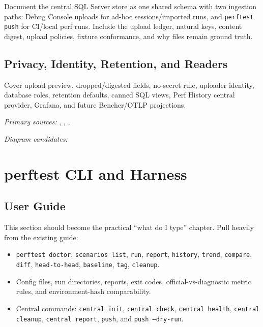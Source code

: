 \documentclass[11pt]{article}
\newcommand{\code}[1]{\texttt{#1}}
\begin{document}
Document the central SQL Server store as one shared schema with two ingestion paths: Debug Console uploads for ad-hoc sessions/imported runs, and \code{perftest push} for CI/local perf runs.  Include the upload ledger, natural keys, content digest, upload policies, fixture conformance, and why files remain ground truth.

\subsection{Privacy, Identity, Retention, and Readers}

Cover upload preview, dropped/digested fields, no-secret rule, uploader identity, database roles, retention defaults, canned SQL views, Perf History central provider, Grafana, and future Bencher/OTLP projections.

\noindent\textit{Primary sources:} , , , 

\noindent\textit{Diagram candidates:} 

\section{perftest CLI and Harness}

\subsection{User Guide}

This section should become the practical ``what do I type'' chapter.  Pull heavily from the existing guide:

\begin{itemize}
	\item \code{perftest doctor}, \code{scenarios list}, \code{run}, \code{report}, \code{history}, \code{trend}, \code{compare}, \code{diff}, \code{head-to-head}, \code{baseline}, \code{tag}, \code{cleanup}.
	\item Config files, run directories, reports, exit codes, official-vs-diagnostic metric rules, and environment-hash comparability.
	\item Central commands: \code{central init}, \code{central check}, \code{central health}, \code{central cleanup}, \code{central report}, \code{push}, and \code{push --dry-run}.
\end{itemize}
\end{document}
